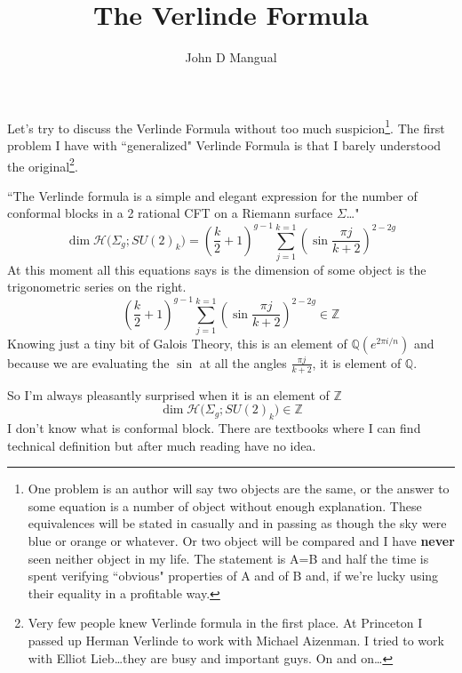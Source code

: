 \documentclass[12pt]{article}
\title{\textbf{ The Verlinde Formula }}
\author{John D Mangual}
\date{}
\begin{document}
\selectfont \fontsize{25}{30}\selectfont

\maketitle


\noindent Let's try to discuss the Verlinde Formula without too much suspicion\footnote{One problem is an author will say two objects are the same, or the answer to some equation is a number of object without enough explanation.  These equivalences will be stated in casually and in passing as though the sky were blue or orange or whatever.  Or two object will be compared and I have \textbf{never} seen neither object in my life.  The statement is A=B and half the time is spent verifying ``obvious" properties of A and of B and, if we're lucky using their equality in a profitable way.}.  The first problem I have with ``generalized" Verlinde Formula is that I barely understood the original\footnote{Very few people knew Verlinde formula in the first place.  At Princeton I passed up Herman Verlinde to work with Michael Aizenman.  I tried to work with Elliot Lieb\dots they are busy and important guys.  On and on\dots}. \newline

\noindent ``The Verlinde formula is a simple and elegant expression for the number of conformal blocks in a 2 rational CFT on a Riemann surface $\Sigma$\dots"
$$ \dim \mathcal{H}\big( \Sigma_g; SU(2)_k \big) 
= \left( \frac{k}{2}+1 \right)^{g-1}
\sum_{j=1}^{k=1} \left( \sin \frac{\pi j}{k+2} \right)^{2-2g}
$$
At this moment all this equations says is the dimension of some object is the trigonometric series on the right.
$$ \left( \frac{k}{2}+1 \right)^{g-1}
\sum_{j=1}^{k=1} \left( \sin \frac{\pi j}{k+2} \right)^{2-2g} \in \mathbb{Z} $$
Knowing just a tiny bit of Galois Theory, this is an element of $\mathbb{Q}(e^{2\pi i / n})$ and because we are evaluating the $\sin$ at all the angles $\frac{\pi j}{k+2}$, it is element of $\mathbb{Q}$. \newline

\noindent So I'm always pleasantly surprised when it is an element of $\mathbb{Z}$
$$ \dim \mathcal{H}\big( \Sigma_g; SU(2)_k \big)  \in \mathbb{Z} $$
I don't know what is conformal block.  There are textbooks where I can find technical definition but after much reading have no idea.
\newpage
\end{document}
